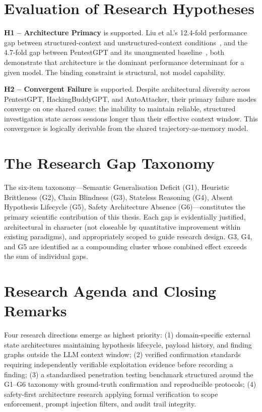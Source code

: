 \documentclass[12pt,a4paper,oneside,openany]{book}
\begin{document}
\section{Evaluation of Research Hypotheses}

\textbf{H1 -- Architecture Primacy} is supported. Liu et al.'s 12.4-fold performance gap between structured-context and unstructured-context conditions~\citep{liu2024gpts}, and the 4.7-fold gap between PentestGPT and its unaugmented baseline~\citep{deng2024pentestgpt}, both demonstrate that architecture is the dominant performance determinant for a given model. The binding constraint is structural, not model capability.

\textbf{H2 -- Convergent Failure} is supported. Despite architectural diversity across PentestGPT, HackingBuddyGPT, and AutoAttacker, their primary failure modes converge on one shared cause: the inability to maintain reliable, structured investigation state across sessions longer than their effective context window. This convergence is logically derivable from the shared trajectory-as-memory model.

\section{The Research Gap Taxonomy}

The six-item taxonomy---Semantic Generalisation Deficit (G1), Heuristic Brittleness (G2), Chain Blindness (G3), Stateless Reasoning (G4), Absent Hypothesis Lifecycle (G5), Safety Architecture Absence (G6)---constitutes the primary scientific contribution of this thesis. Each gap is evidentially justified, architectural in character (not closeable by quantitative improvement within existing paradigms), and appropriately scoped to guide research design. G3, G4, and G5 are identified as a compounding cluster whose combined effect exceeds the sum of individual gaps.

\section{Research Agenda and Closing Remarks}

Four research directions emerge as highest priority: (1) domain-specific external state architectures maintaining hypothesis lifecycle, payload history, and finding graphs outside the LLM context window; (2) verified confirmation standards requiring independently verifiable exploitation evidence before recording a finding; (3) a standardised penetration testing benchmark structured around the G1--G6 taxonomy with ground-truth confirmation and reproducible protocols; (4) safety-first architecture research applying formal verification to scope enforcement, prompt injection filters, and audit trail integrity.
\end{document}

